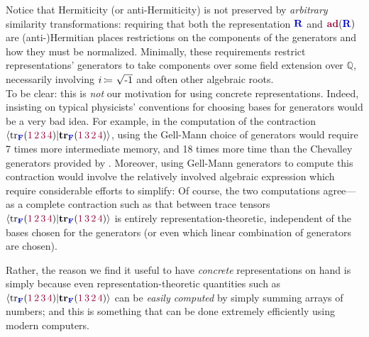 \documentclass[12pt,a4paper]{article}\let\ifpdf\relax
\begin{document}
Notice that Hermiticity (or anti-Hermiticity) is not preserved by \emph{arbitrary} similarity transformations: requiring that both the representation $\mathbf{\b{R}}$ and $\mathbf{\r{ad}}(\mathbf{\b{R}})$ are (anti-)Hermitian places restrictions on the components of the generators and how they must be normalized. Minimally, these requirements restrict representations' generators to take components over some field extension over $\mathbb{Q}$, necessarily involving $i\equivR\sqrt{\text{-}1}$ and often other algebraic roots.\\[-10pt]

To be clear: this is \emph{not} our motivation for using concrete representations. Indeed, insisting on typical physicists' conventions for choosing bases for generators would be a very bad idea. For example, in the computation of the contraction $\langle\mathrm{tr}_{\mathbf{\b{F}}}(\r{1\,2\,3\,4})|\mathbf{tr}_{\mathbf{\b{F}}}(\r{1\,3\,2\,4})\rangle$, using the Gell-Mann choice of generators would require 7 times more intermediate memory, and 18 times more time than the Chevalley generators provided by \rpackage. Moreover, using Gell-Mann generators to compute this contraction would involve the relatively involved algebraic expression which require considerable efforts to simplify:
%
%
Of course, the two computations agree---as a complete contraction such as that between trace tensors $\langle\mathrm{tr}_{\mathbf{\b{F}}}(\r{1\,2\,3\,4})|\mathbf{tr}_{\mathbf{\b{F}}}(\r{1\,3\,2\,4})\rangle$ is entirely representation-theoretic, independent of the bases chosen for the generators (or even which linear combination of generators are chosen). 

Rather, the reason we find it useful to have \emph{concrete} representations on hand is simply because even representation-theoretic quantities such as $\langle\mathrm{tr}_{\mathbf{\b{F}}}(\r{1\,2\,3\,4})|\mathbf{tr}_{\mathbf{\b{F}}}(\r{1\,3\,2\,4})\rangle$ can be \emph{easily computed} by simply summing arrays of numbers; and this is something that can be done extremely efficiently using modern computers. 
\end{document}
